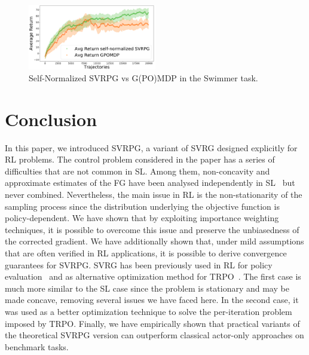 \documentclass{article}
\makeatletter
\theoremstyle{remark}
\theoremstyle{definition}
\DeclareRobustCommand{\eg}{e.g.,\@\xspace}
\newcommand{\todomat}[1]{\todo[color=citrine, inline]{\small #1}}
\makeatother
\begin{document}
\begin{figure}[t]
	\includegraphics[width=0.5\textwidth]{swimmer_self_normalized_SVRPG_vs_GPOMDP}
	\caption{Self-Normalized SVRPG vs G(PO)MDP in the Swimmer task.}
	\label{fig:swimmerone}
\end{figure}



\section{Conclusion}
In this paper, we introduced SVRPG, a variant of SVRG designed explicitly for RL problems.
The control problem considered in the paper has a series of difficulties that are not common in SL.
Among them, non-concavity and approximate estimates of the FG have been analysed independently in SL~\citep[\eg][]{allen2016variance,reddi2016stochastic,harikandeh2015stopwasting} but never combined.
Nevertheless, the main issue in RL is the non-stationarity of the sampling process since the distribution underlying the objective function is policy-dependent.
We have shown that by exploiting importance weighting techniques, it is possible to overcome this issue and preserve the unbiasedness of the corrected gradient.
We have additionally shown that, under mild assumptions that are often verified in RL applications, it is possible to derive convergence guarantees for SVRPG.
{\color{red}SVRG has been previously used in RL for policy evaluation~\citep{du2017svrgpe} and as alternative optimization method for TRPO~\citep{xu2017svrgtrpo}.
The first case is much more similar to the SL case since the problem is stationary and may be made concave, removing several issues we have faced here.
In the second case, it was used as a better optimization technique to solve the per-iteration problem imposed by TRPO.
}
\todomat{Repetition of Section 6?}
Finally, we have empirically shown that practical variants of the theoretical SVRPG version can outperform classical actor-only approaches on benchmark tasks.
\end{document}
